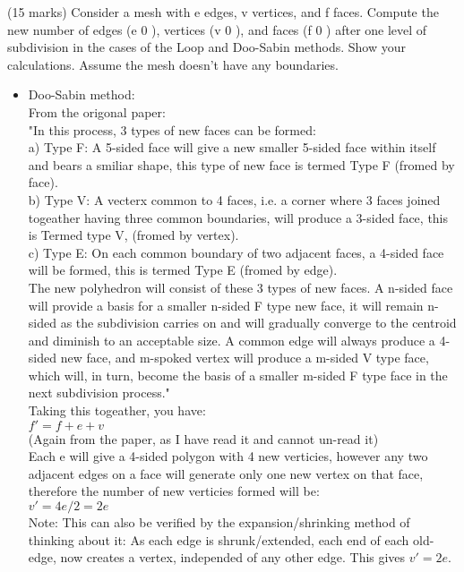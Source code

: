 (15 marks) Consider a mesh with e edges, v vertices, and f faces. Compute the new number
of edges (e 0 ), vertices (v 0 ), and faces (f 0 ) after one level of subdivision in the cases of the
Loop and Doo-Sabin methods. Show your calculations. Assume the mesh doesn’t have any
boundaries.
\begin{itemize}
\item Doo-Sabin method: \\
From the origonal paper: \\
"In this process, 3 types of new faces can be formed: \\
a) Type F: A 5-sided face will give a new smaller 5-sided face within itself and bears a smiliar shape, this type of new face is termed Type F (fromed by face). \\
b) Type V: A vecterx common to 4 faces, i.e. a corner where 3 faces joined togeather having three common boundaries, will produce a 3-sided face, this is Termed type V, (fromed by vertex). \\
c) Type E: On each common boundary of two adjacent faces, a 4-sided face will be formed, this is termed Type E (fromed by edge). \\

  The new polyhedron will consist of these 3 types of new faces. A n-sided face will provide a basis for a smaller n-sided F type new face, it will remain n-sided as the subdivision carries on and will gradually converge to the centroid and diminish to an acceptable size. A common edge will always produce a 4-sided new face, and m-spoked vertex will produce a m-sided V type face, which will, in turn, become the basis of a smaller m-sided F type face in the next subdivision process." \\

Taking this togeather, you have: \\
$f' = f + e + v$ \\

(Again from the paper, as I have read it and cannot un-read it) \\
Each e will give a 4-sided polygon with 4 new verticies, however any two adjacent edges on a face will generate only one new vertex on that face, therefore the number of new verticies formed will be: \\
$v' = 4 e / 2 = 2e$ \\
Note: This can also be verified by the expansion/shrinking method of thinking about it: As each edge is shrunk/extended, each end of each old-edge, now creates a vertex, independed of any other edge. This gives $v' = 2e$. \\


\end{itemize}
